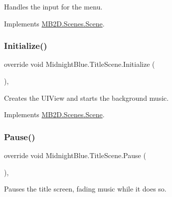 Handles the input for the menu. 



Implements \hyperlink{class_m_b2_d_1_1_scenes_1_1_scene_a476de5a885408d27ff151044d20738c8}{M\+B2\+D.\+Scenes.\+Scene}.

\hypertarget{class_midnight_blue_1_1_title_scene_a793aa8253fba8d62a4ee19f042b22891}{}\label{class_midnight_blue_1_1_title_scene_a793aa8253fba8d62a4ee19f042b22891} 
\subsubsection{\texorpdfstring{Initialize()}{Initialize()}}
{\footnotesize\ttfamily override void Midnight\+Blue.\+Title\+Scene.\+Initialize (\begin{DoxyParamCaption}{ }\end{DoxyParamCaption})\hspace{0.3cm}{\ttfamily [inline]}, {\ttfamily [virtual]}}



Creates the U\+I\+View and starts the background music. 



Implements \hyperlink{class_m_b2_d_1_1_scenes_1_1_scene_a081b4f8866936b495bdce388a7c96c25}{M\+B2\+D.\+Scenes.\+Scene}.

\hypertarget{class_midnight_blue_1_1_title_scene_a046934bfa3290d443b58bcc1de0919db}{}\label{class_midnight_blue_1_1_title_scene_a046934bfa3290d443b58bcc1de0919db} 
\subsubsection{\texorpdfstring{Pause()}{Pause()}}
{\footnotesize\ttfamily override void Midnight\+Blue.\+Title\+Scene.\+Pause (\begin{DoxyParamCaption}{ }\end{DoxyParamCaption})\hspace{0.3cm}{\ttfamily [inline]}, {\ttfamily [virtual]}}



Pauses the title screen, fading music while it does so. 



